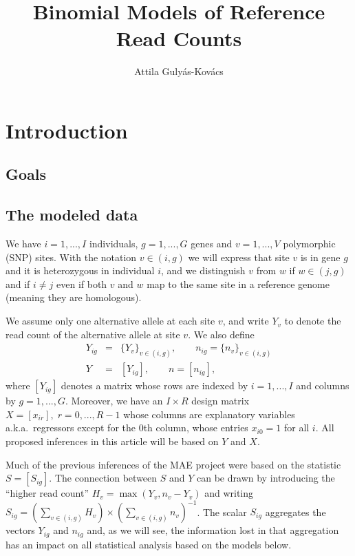 \documentclass[letterpaper]{article}
\title{Binomial Models of Reference Read Counts}
\author{Attila Gulyás-Kovács}
\begin{document}
\maketitle

\section{Introduction}

\subsection{Goals}

\subsection{The modeled data}

We have \(i=1,...,I\) individuals, \(g=1,...,G\) genes and \(v=1,...,V\)
polymorphic (SNP) sites.  With the notation \(v\in(i,g)\) we will express that site \(v\) is in
gene \(g\) and it is heterozygous in individual \(i\), and we distinguish \(v\)
from \(w\) if \(w\in(j,g)\) and if \(i\neq j\) even if both \(v\) and \(w\) map to
the same site in a reference genome (meaning they are homologous).

We assume only one alternative allele at each site \(v\), and write \(Y_v\) to
denote the read count of the alternative allele at site \(v\).  We also define 
\begin{eqnarray}
\label{eq:Y-ig-def}
Y_{ig} &=&  \{Y_v\}_{v\in(i,g)}, \qquad n_{ig} = \{n_v\}_{v\in(i,g)} \\
\label{eq:Y-def}
Y &=&  [Y_{ig}], \qquad n = [n_{ig}],
\end{eqnarray}
where \([Y_{ig}]\) denotes a matrix whose rows are indexed by \(i=1,...,I\)
and columns by \(g=1,...,G\).  Moreover, we have an \(I\times R\) design matrix \(X =
[x_{ir}], \; r=0,...,R-1\) whose columns are explanatory variables
a.k.a.~regressors except for the 0th column, whose entries \(x_{i0}=1\)
for all \(i\). All
proposed inferences in this article will be based on \(Y\) and \(X\).

Much of the previous inferences of the MAE project were based on the statistic
\(S = [S_{ig}]\). The connection between \(S\) and \(Y\) can be drawn by
introducing the ``higher read count'' \(H_{v} = \max(Y_v, n_v-Y_v)\) and
writing \(S_{ig} = \left( \sum_{v\in(i,g)} H_v \right) \times \left(
\sum_{v\in(i,g)} n_v \right)^{-1}\).  The scalar \(S_{ig}\) aggregates the
vectors \(Y_{ig}\) and \(n_{ig}\) and, as we will see, the information lost in
that aggregation has an impact on all statistical analysis based on the models
below.
\end{document}
